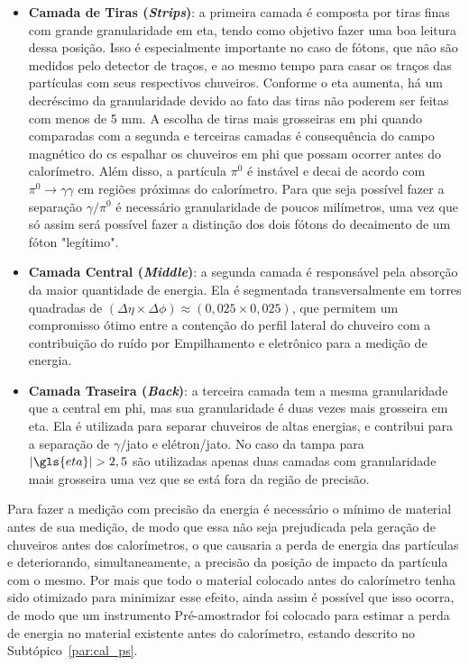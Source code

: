 \begin{itemize}
\item \textbf{Camada de Tiras (\emph{Strips})}: a primeira camada é composta por tiras
finas com grande granularidade em \gls{eta}, tendo como objetivo fazer uma
boa leitura dessa posição. Isso é especialmente importante no caso de fótons,
que não são medidos pelo detector de traços, e ao mesmo tempo para casar os
traços das partículas com seus respectivos chuveiros. Conforme o \gls{eta} aumenta,
há um decréscimo da granularidade devido ao fato das tiras não poderem ser feitas com menos de 5 mm.
A escolha de tiras mais grosseiras em \gls{phi} quando comparadas com a segunda e 
terceiras camadas é consequência do campo magnético do \gls{cs} espalhar os
chuveiros em \gls{phi} que possam ocorrer antes do calorímetro.
Além disso, a partícula $\pi^0$ é instável e decai de acordo com
$\pi^0\rightarrow\gamma\gamma$ em regiões próximas do calorímetro. Para que seja
possível fazer a separação $\gamma/\pi^0$ é necessário granularidade de
poucos milímetros, uma vez que só assim será possível fazer a distinção dos dois
fótons do decaimento de um fóton "legítimo". 
\item \textbf{Camada Central (\emph{Middle})}: a segunda camada é responsável pela
absorção da maior quantidade de energia. Ela é segmentada transversalmente em
torres quadradas de $(\Delta\eta\times\Delta\phi)\approx(0,025\times0,025)$, que
permitem um compromisso ótimo entre a contenção do perfil lateral do chuveiro
com a contribuição do ruído por Empilhamento e eletrônico para a medição de
energia.
\item \textbf{Camada Traseira (\emph{Back})}: a terceira camada tem a mesma
granularidade que a central em \gls{phi}, mas sua granularidade é duas vezes mais grosseira
em \gls{eta}. Ela é utilizada para separar chuveiros de altas energias, e
contribui para a separação de $\gamma/$jato e elétron/jato. No caso da tampa
para $|\gls{eta}|>2,5$ são utilizadas apenas duas camadas com granularidade mais
grosseira uma vez que se está fora da região de precisão.
\end{itemize}

Para fazer a medição com precisão da energia é necessário o mínimo de material 
antes de sua medição, de modo que essa não seja prejudicada pela geração de
chuveiros antes dos calorímetros, o que causaria a perda de energia das
partículas e deteriorando, simultaneamente, a precisão da posição de impacto 
da partícula com o mesmo. Por mais que todo o material colocado antes do
calorímetro tenha sido otimizado para minimizar esse efeito, ainda assim é
possível que isso ocorra, de modo que um instrumento Pré-amostrador foi colocado 
para estimar a perda de energia no material existente antes do calorímetro, 
estando descrito no Subtópico~\ref{par:cal_ps}.


